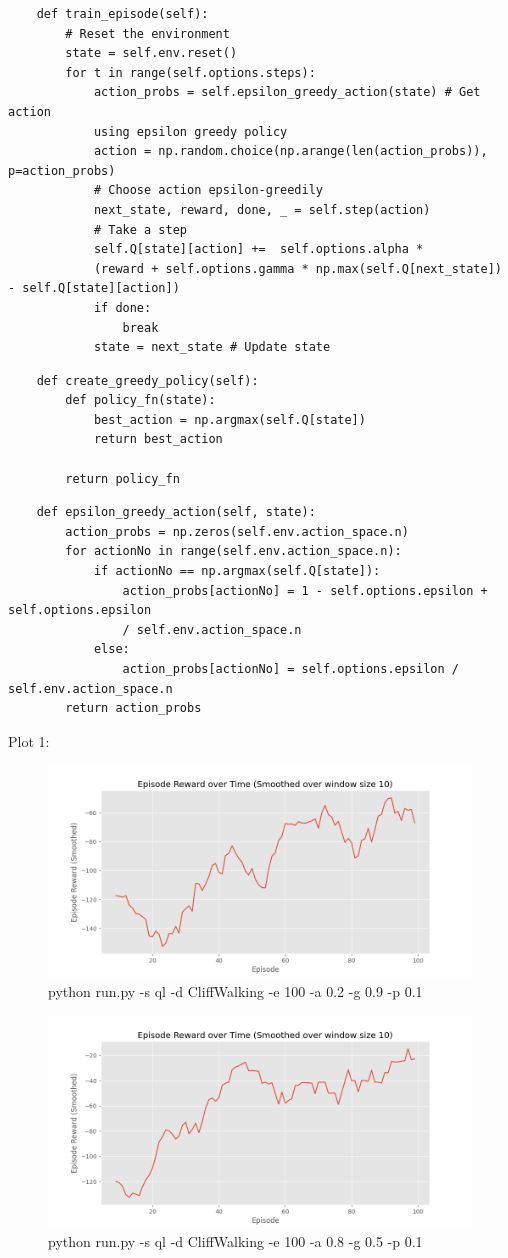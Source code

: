 \documentclass[a4paper]{article}
\theoremstyle{definition}
\begin{document}
\begin{lstlisting}
    def train_episode(self):
        # Reset the environment
        state = self.env.reset()
        for t in range(self.options.steps):
            action_probs = self.epsilon_greedy_action(state) # Get action 
            using epsilon greedy policy
            action = np.random.choice(np.arange(len(action_probs)), p=action_probs) 
            # Choose action epsilon-greedily
            next_state, reward, done, _ = self.step(action) 
            # Take a step
            self.Q[state][action] +=  self.options.alpha * 
            (reward + self.options.gamma * np.max(self.Q[next_state]) - self.Q[state][action]) 
            if done: 
                break
            state = next_state # Update state
\end{lstlisting}
\begin{lstlisting}
    def create_greedy_policy(self):
        def policy_fn(state):
            best_action = np.argmax(self.Q[state])
            return best_action

        return policy_fn
\end{lstlisting}
\begin{lstlisting}
    def epsilon_greedy_action(self, state):
        action_probs = np.zeros(self.env.action_space.n)
        for actionNo in range(self.env.action_space.n):
            if actionNo == np.argmax(self.Q[state]):
                action_probs[actionNo] = 1 - self.options.epsilon + self.options.epsilon 
                / self.env.action_space.n
            else:
                action_probs[actionNo] = self.options.epsilon / self.env.action_space.n
        return action_probs
\end{lstlisting}
Plot 1:
\begin{figure}[H]
    \centering
    \includegraphics[width=0.8\linewidth]{../3_1.png}
    \caption{python run.py -s ql -d CliffWalking -e 100 -a 0.2 -g 0.9 -p 0.1}
    \label{fig:3_1}
\end{figure}
\begin{figure}[H]
    \centering
    \includegraphics[width=0.8\linewidth]{../3_2.png}
    \caption{python run.py -s ql -d CliffWalking -e 100 -a 0.8 -g 0.5 -p 0.1}
    \label{fig:3_2}
\end{figure}
\end{document}
